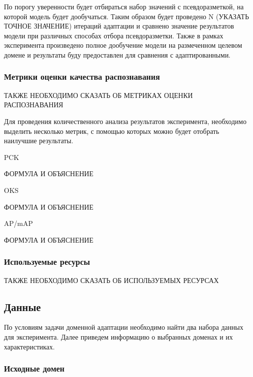 По порогу уверенности будет отбираться набор значений с псевдоразметкой, на которой модель будет дообучаться. Таким образом будет проведено N (УКАЗАТЬ ТОЧНОЕ ЗНАЧЕНИЕ) итераций адаптации и сравнено значение результатов модели при различных способах отбора псевдоразметки. Также в рамках эксперимента произведено полное дообучение модели на размеченном целевом домене и результаты буду предоставлен для сравнения с адаптированными.

\subsubsection*{Метрики оценки качества распознавания}

ТАКЖЕ НЕОБХОДИМО СКАЗАТЬ ОБ МЕТРИКАХ ОЦЕНКИ РАСПОЗНАВАНИЯ

Для проведения количественного анализа результатов эксперимента, необходимо выделить несколько метрик, с помощью которых можно будет отобрать наилучшие результаты.

PCK

ФОРМУЛА И ОБЪЯСНЕНИЕ

OKS

ФОРМУЛА И ОБЪЯСНЕНИЕ

AP/mAP

ФОРМУЛА И ОБЪЯСНЕНИЕ

\subsubsection*{Используемые ресурсы}

ТАКЖЕ НЕОБХОДИМО СКАЗАТЬ ОБ ИСПОЛЬЗУЕМЫХ РЕСУРСАХ


\subsection{Данные}

По условиям задачи доменной адаптации необходимо найти два набора данных для эксперимента. Далее приведем информацию о выбранных доменах и их характеристиках.

\subsubsection*{Исходные домен}


